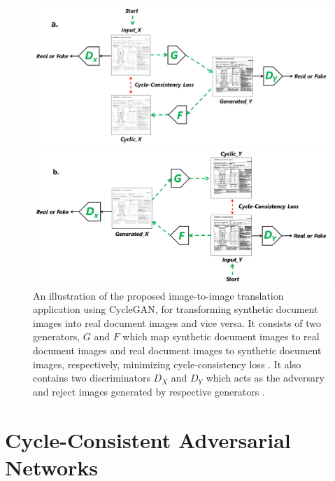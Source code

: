 \begin{figure}[H]
  \centering
  \begin{minipage}[b]{0.98\textwidth}
    \includegraphics[width=\textwidth]{images/Methodology/Gxy.png}
  \end{minipage}
  \vfill
  \begin{minipage}[b]{0.98\textwidth}
    \includegraphics[width=\textwidth]{images/Methodology/Fyx.png}
  \end{minipage}
  \caption[An illustration of the proposed image-to-image translation application using \ac{CycleGAN}, for transforming synthetic document images into real document images and vice versa.]{An illustration of the proposed image-to-image translation application using \ac{CycleGAN}, for transforming synthetic document images into real document images and vice versa. It consists of two generators, $G$ and $F$ which map synthetic document images to real document images and real document images to synthetic document images, respectively, minimizing cycle-consistency loss \cite{zhu2020unpaired}. It also contains two discriminators $D_X$ and $D_Y$ which acts as the adversary and reject images generated by respective generators \cite{zhu2020unpaired}.}
  \label{fig:GxyFyx}
\end{figure}


\section{Cycle-Consistent Adversarial Networks}\label{CycleConsistentAdversarialNetworks}

